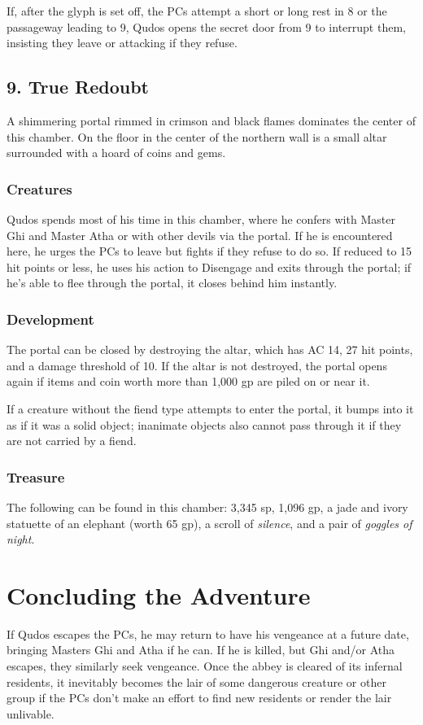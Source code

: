\documentclass[10pt,a4paper,twoside,bg=print,twocolumn,openany,nodeprecatedcode]{dndbook}
\begin{document}
If, after the glyph is set off, the PCs attempt a short or long rest in 8 or the passageway leading to 9, Qudos opens the secret door from 9 to interrupt them, insisting they leave or attacking if they refuse.

\subsection{9. True Redoubt}
\begin{DndReadAloud}{}
A shimmering portal rimmed in crimson and black flames dominates the center of this chamber. On the floor in the center of the northern wall is a small altar surrounded with a hoard of coins and gems.

\end{DndReadAloud}

\subsubsection{Creatures}
Qudos spends most of his time in this chamber, where he confers with Master Ghi and Master Atha or with other devils via the portal. If he is encountered here, he urges the PCs to leave but fights if they refuse to do so. If reduced to 15 hit points or less, he uses his action to Disengage and exits through the portal; if he's able to flee through the portal, it closes behind him instantly.

\subsubsection{Development}
The portal can be closed by destroying the altar, which has AC 14, 27 hit points, and a damage threshold of 10. If the altar is not destroyed, the portal opens again if items and coin worth more than 1,000 gp are piled on or near it.

If a creature without the fiend type attempts to enter the portal, it bumps into it as if it was a solid object; inanimate objects also cannot pass through it if they are not carried by a fiend.

\subsubsection{Treasure}
The following can be found in this chamber: 3,345 sp, 1,096 gp, a jade and ivory statuette of an elephant (worth 65 gp), a scroll of \textit{silence}, and a pair of \textit{goggles of night}.

\section{Concluding the Adventure}
If Qudos escapes the PCs, he may return to have his vengeance at a future date, bringing Masters Ghi and Atha if he can. If he is killed, but Ghi and/or Atha escapes, they similarly seek vengeance. Once the abbey is cleared of its infernal residents, it inevitably becomes the lair of some dangerous creature or other group if the PCs don't make an effort to find new residents or render the lair unlivable.
\end{document}
